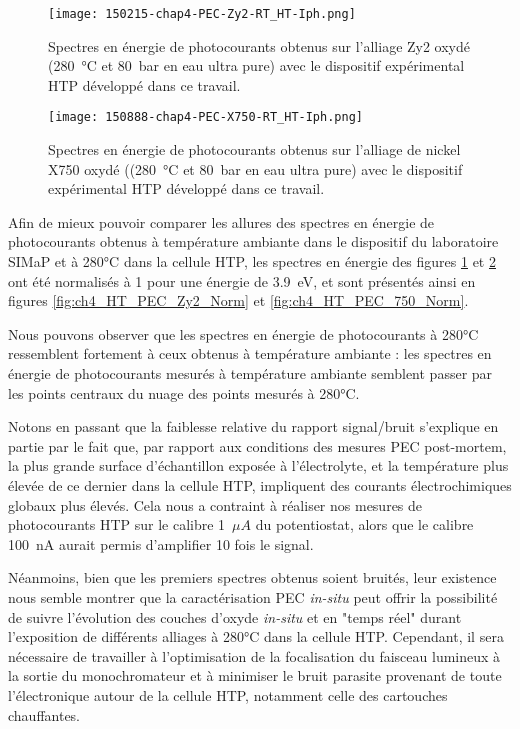 \begin{refsection}
    \begin{figure}[H]
        \centering
        \texttt{[image: 150215-chap4-PEC-Zy2-RT\_HT-Iph.png]}
        \caption{Spectres en énergie de photocourants obtenus sur l’alliage Zy2 oxydé (\SI{280}{\degreeCelsius} et
            \SI{80}{\bar} en eau ultra
        pure) avec le dispositif expérimental HTP développé dans ce travail.}
         \label{fig:ch4_HT_PEC_Zy2}
    \end{figure}

    \begin{figure}[H]
        \centering
        \texttt{[image: 150888-chap4-PEC-X750-RT\_HT-Iph.png]}
        \caption{Spectres en énergie de photocourants obtenus sur l’alliage de nickel X750 oxydé ((\SI{280}{\degreeCelsius} et
            \SI{80}{\bar} en
        eau ultra pure) avec le dispositif expérimental HTP développé dans ce travail.}
        \label{fig:ch4_HT_PEC_750}
    \end{figure}


    Afin de mieux pouvoir comparer les allures des spectres en énergie de photocourants obtenus à température ambiante
    dans le dispositif du laboratoire SIMaP et à 280°C dans la cellule HTP, les spectres en énergie des figures
    \ref{fig:ch4_HT_PEC_Zy2} et \ref{fig:ch4_HT_PEC_750}
    ont été normalisés à 1 pour une énergie de 3.9~eV, et sont présentés ainsi en figures \ref{fig:ch4_HT_PEC_Zy2_Norm} et 
    \ref{fig:ch4_HT_PEC_750_Norm}.
    
    Nous pouvons observer que les spectres en énergie de photocourants à 280°C ressemblent fortement à ceux
    obtenus à température ambiante : les spectres en énergie de photocourants mesurés à température ambiante semblent
    passer par les points centraux du nuage des points mesurés à 280°C. 

    Notons en passant que la faiblesse relative du rapport signal/bruit s’explique en partie par le fait que, par
    rapport aux conditions des mesures PEC post-mortem, la plus grande surface d’échantillon exposée à l’électrolyte, et
    la température plus élevée de ce dernier dans la cellule HTP, impliquent des courants électrochimiques globaux plus
    élevés. Cela nous a contraint à réaliser nos mesures de photocourants HTP sur le calibre 1~$\mu A$ du potentiostat, alors
    que le calibre 100~nA aurait permis d’amplifier 10 fois le signal. 
    
    Néanmoins, bien que les premiers spectres obtenus soient bruités, leur existence nous semble montrer que la
    caractérisation PEC \emph{in-situ} peut offrir la possibilité de suivre l’évolution des couches d’oxyde
    \emph{in-situ} et en 
    "temps réel" durant l’exposition de différents alliages à 280°C dans la cellule HTP. Cependant, il sera nécessaire
    de travailler à l’optimisation de la focalisation du faisceau lumineux à la sortie du monochromateur et à minimiser
    le bruit parasite provenant de toute l’électronique autour de la cellule HTP, notamment celle des cartouches
    chauffantes. 
    

\end{refsection}
